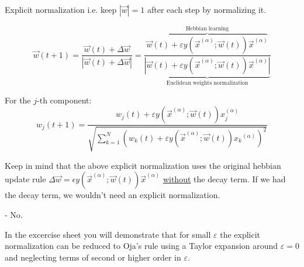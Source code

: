 \begin{frame}{\subsubsecname}

\begin{block}{Explicit normalization} 
i.e. keep $|\vec w| = 1$ after each step by normalizing it.

\begin{equation}
	\vec{w}(t+1) = 
    \frac{\vec w(t) + \Delta \vec w}{|\vec w(t) + \Delta \vec w|} 
    = \frac
    {\overbrace{\vec{w}(t) + \varepsilon y(\vec{x}^{(\alpha)}; \vec{w}(t)) \vec{x}^{(\alpha)}}^{\text{Hebbian learning}}}
    {\underbrace{\left| \vec{w}(t) + \varepsilon y(\vec{x}^{(\alpha)}; \vec{w}(t)) \vec{x}^{(\alpha)} \right|}_{\text{Euclidean weights normalization}}}
\end{equation}

For the $j$-th component:\\
\begin{equation*}
    w_j(t+1) = \frac
    {w_j(t) + \varepsilon y(\vec{x}^{(\alpha)}; \vec{w}(t)) x_j^{(\alpha)}}
    {\sqrt{ \sum_{k=1}^{N} \left( w_k(t) + \varepsilon y(\vec{x}^{(\alpha)}; \vec{w}(t)) {x_k}^{(\alpha)} \right)^2}}
\end{equation*}
\end{block}

Keep in mind that the above explicit normalization uses the original hebbian update rule 
$\Delta \vec w = \epsilon y(\vec x^ {(\alpha)}; \vec w(t)) \vec x^{(\alpha)}$ \underline{without} the decay term. 
If we had the decay term, we wouldn't need an explicit normalization.

\end{frame}

\begin{frame}


- No.\\

\pause

In the excercise sheet you will demonstrate that for small $\varepsilon$ the explicit normalization can be reduced to Oja's rule using a Taylor expansion around $\varepsilon = 0$ and neglecting terms of second or higher order in $\varepsilon$. 

\end{frame}
